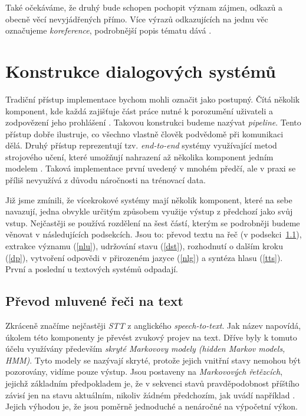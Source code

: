 Také očekáváme, že druhý bude schopen pochopit význam zájmen, odkazů
a obecně věcí nevyjádřených přímo. Více výrazů odkazujících na jednu věc
označujeme \textit{koreference}, podrobnější popis tématu dává
\citet[kapitola 21]{jurafsky_slp_2020}.


\section{Konstrukce dialogových systémů}

Tradiční přístup implementace bychom mohli označit jako postupný. Čítá několik
komponent, kde každá zajišťuje část práce nutné k porozumění uživateli a
zodpovězení jeho prohlášení \citep[sekce 4.1]{gao_neural_2019}. Takovou konstrukci budeme nazývat \textit{pipeline}.
Tento přístup dobře ilustruje, co všechno vlastně
člověk podvědomě při komunikaci dělá. Druhý přístup reprezentují tzv. \textit{end-to-end}
systémy využívající metod strojového učení, které umožňují nahrazení až
několika komponent jedním modelem \citep[sekce 4.6]{gao_neural_2019}. Taková implementace první uvedený v mnohém
předčí, ale v praxi se příliš nevyužívá z důvodu náročnosti na trénovací data.

Již jsme zmínili, že vícekrokové systémy mají několik komponent, které na sebe
navazují, jedna obvykle určitým způsobem využije výstup z předchozí jako svůj
vstup. Nejčastěji se používá rozdělení na šest částí, kterým se podrobněji
budeme věnovat v následujících podsekcích. Jsou to: převod textu na řeč (v podsekci~\ref{stt}),
extrakce významu (\ref{nlu}), udržování stavu (\ref{dst}), rozhodnutí o dalším kroku (\ref{dp}),
vytvoření odpovědi v přirozeném jazyce (\ref{nlg}) a syntéza hlasu (\ref{tts}). První
a poslední u textových systémů odpadají.

\subsection{Převod mluvené řeči na text}\label{stt}

Zkráceně značíme nejčastěji \textit{STT} z anglického \textit{speech-to-text}.
Jak název napovídá, úkolem této komponenty je převést zvukový projev na text.
Dříve byly k tomuto účelu využívány především \textit{skryté
    Markovovy modely (hidden Markov models, HMM)}. Tyto modely se nazývají skryté,
protože jejich vnitřní stavy nemohou být pozorovány, vidíme pouze výstup.
Jsou postaveny na \textit{Markovových řetězcích}, jejichž základním předpokladem
je, že v sekvenci stavů pravděpodobnost příštího závisí jen na stavu aktuálním,
nikoliv žádném předchozím, jak uvádí například \citet[strana 4]{brooks_handbook_2011}.
Jejich výhodou je, že jsou poměrně jednoduché a nenáročné na výpočetní výkon.

